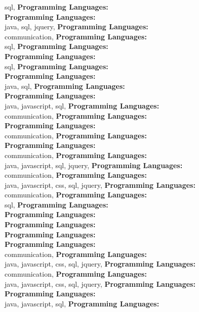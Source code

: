 sql, \textbf{Programming Languages:} \\
\textbf{Programming Languages:} \\
java, sql, jquery, \textbf{Programming Languages:} \\
communication, \textbf{Programming Languages:} \\
sql, \textbf{Programming Languages:} \\
\textbf{Programming Languages:} \\
sql, \textbf{Programming Languages:} \\
\textbf{Programming Languages:} \\
java, sql, \textbf{Programming Languages:} \\
\textbf{Programming Languages:} \\
java, javascript, sql, \textbf{Programming Languages:} \\
communication, \textbf{Programming Languages:} \\
\textbf{Programming Languages:} \\
communication, \textbf{Programming Languages:} \\
\textbf{Programming Languages:} \\
communication, \textbf{Programming Languages:} \\
java, javascript, sql, jquery, \textbf{Programming Languages:} \\
communication, \textbf{Programming Languages:} \\
java, javascript, css, sql, jquery, \textbf{Programming Languages:} \\
communication, \textbf{Programming Languages:} \\
sql, \textbf{Programming Languages:} \\
\textbf{Programming Languages:} \\
\textbf{Programming Languages:} \\
\textbf{Programming Languages:} \\
\textbf{Programming Languages:} \\
communication, \textbf{Programming Languages:} \\
java, javascript, css, sql, jquery, \textbf{Programming Languages:} \\
communication, \textbf{Programming Languages:} \\
java, javascript, css, sql, jquery, \textbf{Programming Languages:} \\
\textbf{Programming Languages:} \\
java, javascript, sql, \textbf{Programming Languages:} \\
